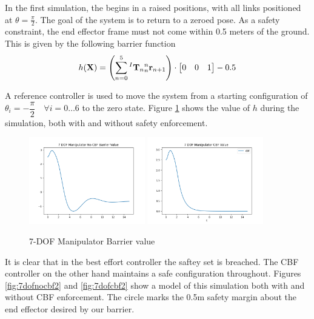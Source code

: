 In the first simulation, the begins in a raised positions, with all links positioned at $\theta = \frac{\pi}{2}$. The goal of the system is to return to a zeroed pose. As a safety constraint, the end effector frame must not come within 0.5 meters of the ground. This is given by the following barrier function
\begin{align}
    h(\mathbf{X}) = \left (\sum_{n=0}^5 {^I\mathbf{T}_n}{^n_n\mathbf{r}_{n+1}} \right) \cdot \begin{bmatrix} 0 & 0 & 1\end{bmatrix} - 0.5
\end{align}

\noindent A reference controller is used to move the system from a starting configuration of $\theta_i = -\dfrac{\pi}{2} \quad \forall i= 0\hdots6$ to the zero state. Figure \ref{fig:7dofbarriervalue2} shows the value of $h$ during the simulation, both with and without safety enforcement.

\begin{figure}[H]
    \centering
    \includegraphics[width=0.45\textwidth]{Figures/Examples/7DOF/7DOFNoCBFValue.png}
    \includegraphics[width=0.45\textwidth]{Figures/Examples/7DOF/7DOFCBFValue.png}
    \caption{7-DOF Manipulator Barrier value}
    \label{fig:7dofbarriervalue2}
\end{figure}

\noindent It is clear that in the best effort controller the saftey set is breached. The CBF controller on the other hand maintains a safe configuration throughout. Figures \ref{fig:7dofnocbf2} and \ref{fig:7dofcbf2} show a model of this simulation both with and without CBF enforcement. The circle marks the 0.5m safety margin about the end effector desired by our barrier.

